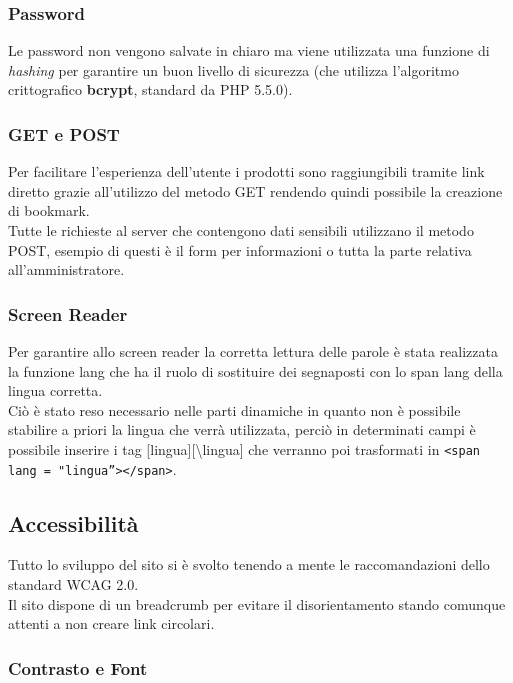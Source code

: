 \documentclass[a4paper, 11pt]{article}
\begin{document}
\subsubsection{Password}
Le password non vengono salvate in chiaro ma viene utilizzata una funzione di \textit{hashing} per garantire un buon livello di sicurezza (che utilizza l’algoritmo crittografico \textbf{bcrypt}, standard da PHP 5.5.0).

\subsubsection{GET e POST}
Per facilitare l’esperienza dell’utente i prodotti sono raggiungibili tramite link diretto grazie all’utilizzo del metodo GET rendendo quindi possibile la creazione di bookmark. \\

Tutte le richieste al server che contengono dati sensibili utilizzano il metodo POST, esempio di questi è il form per informazioni o tutta la parte relativa all’amministratore.

\subsubsection{Screen Reader}
Per garantire allo screen reader la corretta lettura delle parole è stata realizzata la funzione lang che ha il ruolo di sostituire dei segnaposti con lo span lang della lingua corretta. \\
Ciò è stato reso necessario nelle parti dinamiche in quanto non è possibile stabilire a priori la lingua che verrà utilizzata, perciò in determinati campi è possibile inserire i tag [lingua][\textbackslash lingua] che verranno poi trasformati in \texttt{<span lang =  "lingua”></span>}.

\pagebreak

\subsection{Accessibilità}

Tutto lo sviluppo del sito si è svolto tenendo a mente le raccomandazioni dello standard WCAG 2.0. \\
Il sito dispone di un breadcrumb per evitare il disorientamento stando comunque attenti a non creare link circolari. 

\subsubsection{Contrasto e Font}
\end{document}
